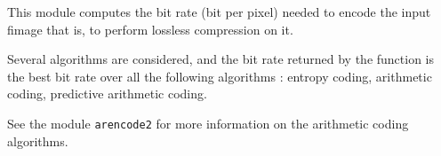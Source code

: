 This module computes the bit rate (bit per pixel) needed to encode
the input fimage that is, to perform lossless compression on it.

Several algorithms are considered, and the bit rate returned by the 
function is the best bit rate over all the following algorithms :
entropy coding, arithmetic coding, predictive arithmetic coding.

See the module \verb+arencode2+ for more information on the arithmetic
coding algorithms.

